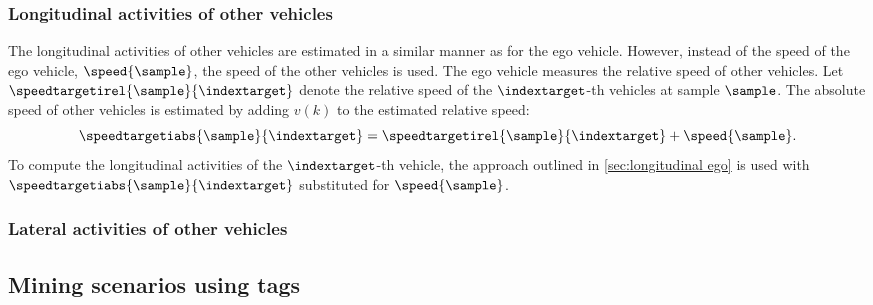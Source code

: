 



\subsubsection{Longitudinal activities of other vehicles}
\label{sec:longitudinal other vehicles}

The longitudinal activities of other vehicles are estimated in a similar manner as for the ego vehicle. However, instead of the speed of the ego vehicle, $\speed{\sample}$, the speed of the other vehicles is used. The ego vehicle measures the relative speed of other vehicles. Let $\speedtargetirel{\sample}{\indextarget}$ denote the relative speed of the $\indextarget$-th vehicles at sample $\sample$. The absolute speed of other vehicles is estimated by adding $v(k)$ to the estimated relative speed:
\begin{equation}
	\speedtargetiabs{\sample}{\indextarget} = \speedtargetirel{\sample}{\indextarget} + \speed{\sample}.
\end{equation}
To compute the longitudinal activities of the $\indextarget$-th vehicle, the approach outlined in \cref{sec:longitudinal ego} is used with $\speedtargetiabs{\sample}{\indextarget}$ substituted for $\speed{\sample}$. 



\subsubsection{Lateral activities of other vehicles}
\label{sec:lateral other vehicles}

	
	
	
\subsection{Mining scenarios using tags}
\label{sec:mining}

